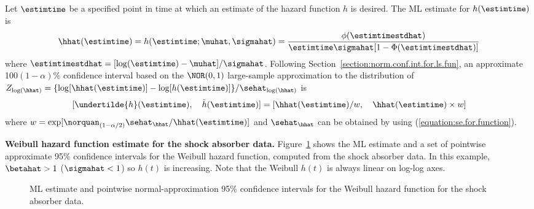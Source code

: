 Let $\estimtime$ be a specified point in time at which an estimate of
the hazard function $h$ is desired.  The ML estimate for
$h(\estimtime)$ is 
\begin{displaymath}
\hhat(\estimtime)=h(\estimtime; \muhat, \sigmahat) =
	\frac{\phi(\estimtimestdhat)}{\estimtime 
	\sigmahat [1-\Phi(\estimtimestdhat)]}
\end{displaymath}
where $\estimtimestdhat=[\log(\estimtime)-\muhat]/\sigmahat$.
Following Section~\ref{section:norm.conf.int.for.ls.fun}, an
approximate 100$(1-\alpha)\%$  confidence interval based on the
$\NOR(0,1)$ large-sample approximation to the distribution of
$Z_{\log(\hhat)}=\{\log[\hhat(\estimtime)]-\log[h(\estimtime)]\}/\sehat_{\log(\hhat)}$
is
\begin{equation}
\label{equation:locscale.hazard.normal}
[ \undertilde{h}(\estimtime),\quad \tilde{h}(\estimtime) ]=
[\hhat(\estimtime)/w, \quad \hhat(\estimtime) \times w]
\end{equation}
where $w=\exp[\norquan_{(1-\alpha/2)}
\sehat_{\hhat}/\hhat(\estimtime)]$
and $\sehat_{\hhat}$ can be obtained by using
(\ref{equation:se.for.function}).
\begin{example}
{\bf Weibull hazard function estimate for the shock absorber data.}
Figure~\ref{figure:shockabsB.weib.haz.ps} shows the ML estimate and a
set of pointwise approximate 95\% confidence intervals for the Weibull
hazard function, computed from the shock absorber data.  In this
example, $\betahat>1$ ($\sigmahat<1$) so $h(t)$ is increasing.  Note that
the Weibull $h(t)$ is always linear on log-log axes.
\begin{figure}
\caption{ML estimate and pointwise normal-approximation 95\% confidence
intervals for the Weibull hazard function for the shock absorber data.}
\label{figure:shockabsB.weib.haz.ps}
\end{figure}
\end{example}


